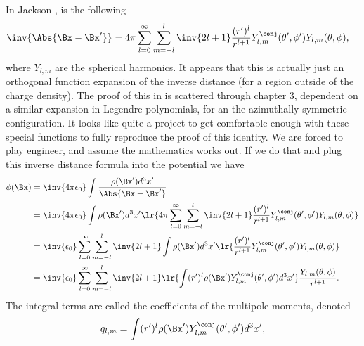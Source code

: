 %
%
%
%
In Jackson
\citep{jackson1975cew}
,
is the following
%
\begin{equation}\label{eqn:emtLecture8:420}
\begin{aligned}
\inv{\Abs{\Bx - \Bx'}}
&=
4 \pi \sum_{l = 0}^\infty \sum_{m = -l}^l \inv{2 l + 1} \frac{(r')^l}{r^{l+1}}
Y^\conj_{l,m}(\theta', \phi')
Y_{l,m}(\theta, \phi),
\end{aligned}
\end{equation}
%
where \( Y_{l,m} \) are the spherical harmonics.  It appears that this is actually just an orthogonal function expansion of the inverse distance (for a region outside of the charge density).  The proof of this in is scattered through chapter 3, dependent on a similar expansion in Legendre polynomials, for an the azimuthally symmetric configuration.
%
It looks like quite a project to get comfortable enough with these special functions to fully reproduce the proof of this identity.  We are forced to play engineer, and assume the mathematics works out.  If we do that and plug this inverse distance formula into
the potential we have
%
\begin{equation}\label{eqn:emtLecture8:440}
\begin{aligned}
\phi(\Bx)
&= \inv{4 \pi \epsilon_0} \int \frac{\rho(\Bx') d^3 x'}{\Abs{\Bx - \Bx'}}
\\ &=
\inv{4 \pi \epsilon_0} \int \rho(\Bx') d^3 x' \lr{
4 \pi \sum_{l = 0}^\infty \sum_{m = -l}^l \inv{2 l + 1} \frac{(r')^l}{r^{l+1}}
Y^\conj_{l,m}(\theta', \phi')
Y_{l,m}(\theta, \phi)
}
\\ &=
\inv{\epsilon_0}
\sum_{l= 0}^\infty \sum_{m = -l}^l \inv{2 l + 1}
\int \rho(\Bx') d^3 x' \lr{
\frac{(r')^l}{r^{l+1}}
Y^\conj_{l,m}(\theta', \phi')
Y_{l,m}(\theta, \phi)
}
\\ &=
\inv{\epsilon_0}
\sum_{l= 0}^\infty \sum_{m = -l}^l \inv{2 l + 1}
\lr{
\int (r')^l \rho(\Bx')
Y^\conj_{l,m}(\theta', \phi')
d^3 x'
}
\frac{
Y_{l,m}(\theta, \phi)
}
{
r^{l+1}
}.
\end{aligned}
\end{equation}
%
The integral terms are called the coefficients of the multipole moments, denoted
\begin{equation}\label{eqn:emtLecture8:480}
q_{l,m} =
\int (r')^l \rho(\Bx')
Y^\conj_{l,m}(\theta', \phi')
d^3 x',
\end{equation}
